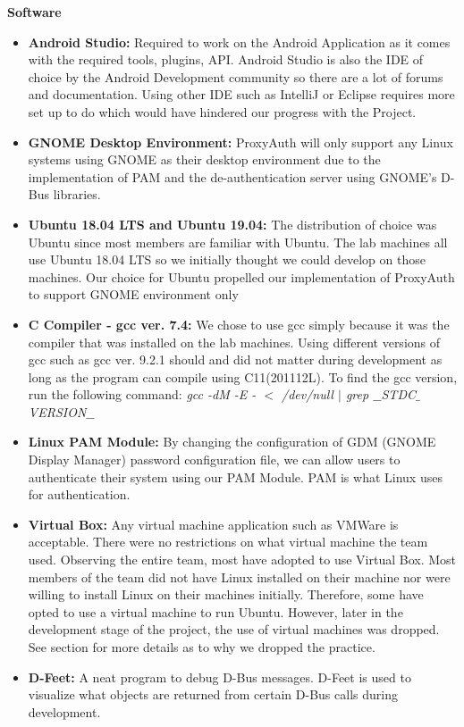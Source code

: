 \documentclass[letterpaper,twocolumn,10pt]{article}
\begin{document}
\hrulefill

\textbf{Software}
\begin{itemize}[noitemsep]
\item \textbf{Android Studio:} Required to work on the Android Application as it comes with the required tools, plugins, API. Android Studio is also the IDE of choice by the Android Development community so there are a lot of forums and documentation. Using other IDE such as IntelliJ or Eclipse requires more set up to do which would have hindered our progress with the Project.
\item \textbf{GNOME Desktop Environment:} ProxyAuth will only support any Linux systems using GNOME as their desktop environment due to the implementation of PAM and the de-authentication server using GNOME's D-Bus libraries.

\item \textbf{Ubuntu 18.04 LTS and Ubuntu 19.04:} The distribution of choice was Ubuntu since most members are familiar with Ubuntu. The lab machines all use Ubuntu 18.04 LTS so we initially thought we could develop on those machines. Our choice for Ubuntu propelled our implementation of ProxyAuth to support GNOME environment only

\item \textbf{C Compiler - gcc ver. 7.4:} We chose to use gcc simply because it was the compiler that was installed on the lab machines. Using different versions of gcc such as gcc ver. 9.2.1 should and did not matter during development as long as the program can compile using C11(201112L). To find the gcc version, run the following command: \emph{gcc -dM -E - $<$ /dev/null $|$ grep $\_\_$STDC$\_$VERSION$\_\_$}
\item \textbf{Linux PAM Module:} By changing the configuration of GDM (GNOME Display Manager) password configuration file, we can allow users to authenticate their system using our PAM Module. PAM is what Linux uses for authentication.

\item \textbf{Virtual Box:} Any virtual machine application such as VMWare is acceptable. There were no restrictions on what virtual machine the team used. Observing the entire team, most have adopted to use Virtual Box. Most members of the team did not have Linux installed on their machine nor were willing to install Linux on their machines initially. Therefore, some have opted to use a virtual machine to run Ubuntu. However, later in the development stage of the project, the use of virtual machines was dropped. See section \textbf{} for more details as to why we dropped the practice.

\item \textbf{D-Feet:} A neat program to debug D-Bus messages. D-Feet is used to visualize what objects are returned from certain D-Bus calls during development.
\end{itemize}
\end{document}
